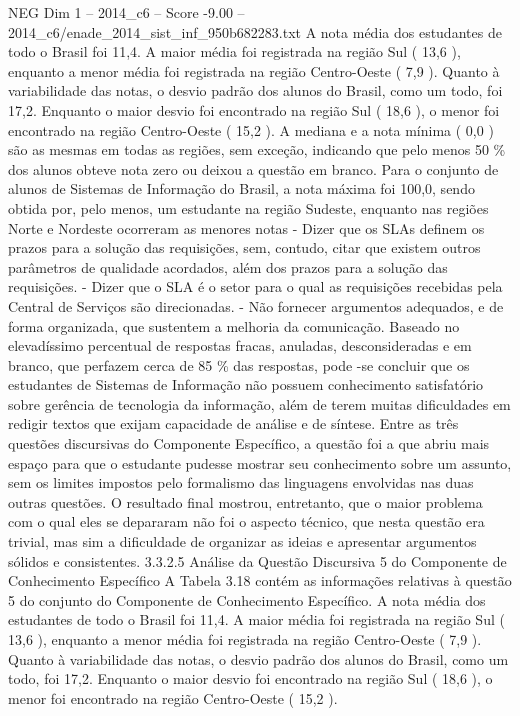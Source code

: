 \begin{textsample}{NEG Dim 1 – 2014\_c6 – Score -9.00 – 2014\_c6/enade\_2014\_sist\_inf\_950b682283.txt}
A nota média dos estudantes de todo o Brasil foi 11,4.
A maior média foi registrada na região Sul ( 13,6 ), enquanto a menor média foi registrada na região Centro-Oeste ( 7,9 ).
Quanto à variabilidade das notas, o desvio padrão dos alunos do Brasil, como um todo, foi 17,2.
Enquanto o maior desvio foi encontrado na região Sul ( 18,6 ), o menor foi encontrado na região Centro-Oeste ( 15,2 ).
A mediana e a nota mínima ( 0,0 ) são as mesmas em todas as regiões, sem exceção, indicando que pelo menos 50 \% dos alunos obteve nota zero ou deixou a questão em branco.
Para o conjunto de alunos de Sistemas de Informação do Brasil, a nota máxima foi 100,0, sendo obtida por, pelo menos, um estudante na região Sudeste, enquanto nas regiões Norte e Nordeste ocorreram as menores notas - Dizer que os SLAs definem os prazos para a solução das requisições, sem, contudo, citar que existem outros parâmetros de qualidade acordados, além dos prazos para a solução das requisições. - Dizer que o SLA é o setor para o qual as requisições recebidas pela Central de Serviços são direcionadas. - Não fornecer argumentos adequados, e de forma organizada, que sustentem a melhoria da comunicação.
Baseado no elevadíssimo percentual de respostas fracas, anuladas, desconsideradas e em branco, que perfazem cerca de 85 \% das respostas, pode -se concluir que os estudantes de Sistemas de Informação não possuem conhecimento satisfatório sobre gerência de tecnologia da informação, além de terem muitas dificuldades em redigir textos que exijam capacidade de análise e de síntese.
Entre as três questões discursivas do Componente Específico, a questão foi a que abriu mais espaço para que o estudante pudesse mostrar seu conhecimento sobre um assunto, sem os limites impostos pelo formalismo das linguagens envolvidas nas duas outras questões.
O resultado final mostrou, entretanto, que o maior problema com o qual eles se depararam não foi o aspecto técnico, que nesta questão era trivial, mas sim a dificuldade de organizar as ideias e apresentar argumentos sólidos e consistentes. 3.3.2.5 Análise da Questão Discursiva 5 do Componente de Conhecimento Específico A Tabela 3.18 contém as informações relativas à questão 5 do conjunto do Componente de Conhecimento Específico.
A nota média dos estudantes de todo o Brasil foi 11,4.
A maior média foi registrada na região Sul ( 13,6 ), enquanto a menor média foi registrada na região Centro-Oeste ( 7,9 ).
Quanto à variabilidade das notas, o desvio padrão dos alunos do Brasil, como um todo, foi 17,2.
Enquanto o maior desvio foi encontrado na região Sul ( 18,6 ), o menor foi encontrado na região Centro-Oeste ( 15,2 ).

\end{textsample}
